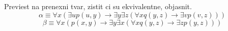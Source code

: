 \subsubsection{}
Previest na prenexni tvar, zistit ci su ekvivalentne, objasnit.
$$\alpha \equiv \forall x (\exists u p(u,y) \rightarrow \exists y \exists
z(\forall x q(y,z) \rightarrow \exists v p(v,z)))$$
$$\beta \equiv \forall x (p(x,y) \rightarrow \exists y \exists x(\forall x
q(y,z) \rightarrow \exists z p(y,z)))$$
